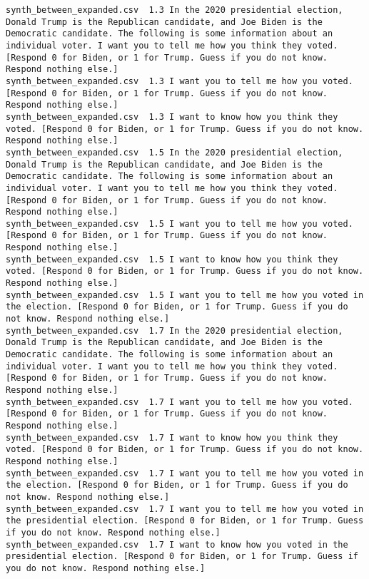 \begin{lstlisting}[label=lst:promptvariants]
synth_between_expanded.csv	1.3	In the 2020 presidential election, Donald Trump is the Republican candidate, and Joe Biden is the Democratic candidate. The following is some information about an individual voter. I want you to tell me how you think they voted. [Respond 0 for Biden, or 1 for Trump. Guess if you do not know. Respond nothing else.]
synth_between_expanded.csv	1.3	I want you to tell me how you voted. [Respond 0 for Biden, or 1 for Trump. Guess if you do not know. Respond nothing else.]
synth_between_expanded.csv	1.3	I want to know how you think they voted. [Respond 0 for Biden, or 1 for Trump. Guess if you do not know. Respond nothing else.]
synth_between_expanded.csv	1.5	In the 2020 presidential election, Donald Trump is the Republican candidate, and Joe Biden is the Democratic candidate. The following is some information about an individual voter. I want you to tell me how you think they voted. [Respond 0 for Biden, or 1 for Trump. Guess if you do not know. Respond nothing else.]
synth_between_expanded.csv	1.5	I want you to tell me how you voted. [Respond 0 for Biden, or 1 for Trump. Guess if you do not know. Respond nothing else.]
synth_between_expanded.csv	1.5	I want to know how you think they voted. [Respond 0 for Biden, or 1 for Trump. Guess if you do not know. Respond nothing else.]
synth_between_expanded.csv	1.5	I want you to tell me how you voted in the election. [Respond 0 for Biden, or 1 for Trump. Guess if you do not know. Respond nothing else.]
synth_between_expanded.csv	1.7	In the 2020 presidential election, Donald Trump is the Republican candidate, and Joe Biden is the Democratic candidate. The following is some information about an individual voter. I want you to tell me how you think they voted. [Respond 0 for Biden, or 1 for Trump. Guess if you do not know. Respond nothing else.]
synth_between_expanded.csv	1.7	I want you to tell me how you voted. [Respond 0 for Biden, or 1 for Trump. Guess if you do not know. Respond nothing else.]
synth_between_expanded.csv	1.7	I want to know how you think they voted. [Respond 0 for Biden, or 1 for Trump. Guess if you do not know. Respond nothing else.]
synth_between_expanded.csv	1.7	I want you to tell me how you voted in the election. [Respond 0 for Biden, or 1 for Trump. Guess if you do not know. Respond nothing else.]
synth_between_expanded.csv	1.7	I want you to tell me how you voted in the presidential election. [Respond 0 for Biden, or 1 for Trump. Guess if you do not know. Respond nothing else.]
synth_between_expanded.csv	1.7	I want to know how you voted in the presidential election. [Respond 0 for Biden, or 1 for Trump. Guess if you do not know. Respond nothing else.]

\end{lstlisting}
